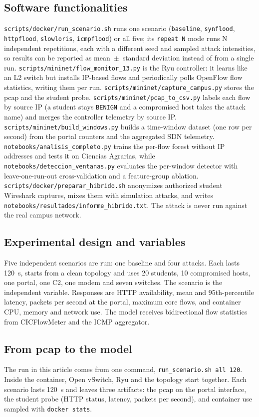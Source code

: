 \documentclass[ASNA,twocolumn]{USG}
\begin{document}
\subsection{Software functionalities}
\texttt{scripts/docker/run\_scenario.sh} runs one scenario
(\texttt{baseline}, \texttt{synflood}, \texttt{httpflood},
\texttt{slowloris}, \texttt{icmpflood}) or all five; its
\texttt{repeat N} mode runs N independent repetitions, each with a
different seed and sampled attack intensities, so results can be
reported as mean~$\pm$~standard deviation instead of from a single run.
\texttt{scripts/mininet/flow\_monitor\_13.py} is the Ryu controller: it
learns like an L2 switch but installs IP-based flows and periodically
polls OpenFlow flow statistics, writing them per run.
\texttt{scripts/mininet/capture\_campus.py} stores the pcap and the
student probe. \texttt{scripts/mininet/pcap\_to\_csv.py} labels each
flow by source IP (a student stays \texttt{BENIGN} and a compromised
host takes the attack name) and merges the controller telemetry by
source IP. \texttt{scripts/mininet/build\_windows.py} builds a
time-window dataset (one row per second) from the portal counters and
the aggregated SDN telemetry.
\texttt{notebooks/analisis\_completo.py} trains the per-flow forest
without IP addresses and tests it on Ciencias Agrarias, while
\texttt{notebooks/deteccion\_ventanas.py} evaluates the per-window
detector with leave-one-run-out cross-validation and a feature-group
ablation.
\texttt{scripts/docker/preparar\_hibrido.sh} anonymizes authorized
student Wireshark captures, mixes them with simulation attacks, and
writes \texttt{notebooks/resultados/informe\_hibrido.txt}. The attack
is never run against the real campus network.

\subsection{Experimental design and variables}
Five independent scenarios are run: one baseline and four attacks.
Each lasts 120~s, starts from a clean topology and uses 20 students,
10 compromised hosts, one portal, one C2, one modem and seven
switches. The scenario is the independent variable. Responses are
HTTP availability, mean and 95th-percentile latency, packets per
second at the portal, maximum core flows, and container CPU, memory
and network use. The model receives bidirectional flow statistics
from CICFlowMeter and the ICMP aggregator.

\subsection{From pcap to the model}
The run in this article comes from one command,
\texttt{run\_scenario.sh all 120}. Inside the container, Open
vSwitch, Ryu and the topology start together. Each scenario lasts
120~s and leaves three artifacts: the pcap on the portal interface,
the student probe (HTTP status, latency, packets per second), and
container use sampled with \texttt{docker stats}.
\end{document}

